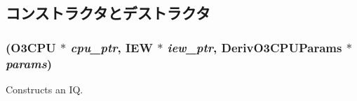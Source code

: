 \subsection{コンストラクタとデストラクタ}
\hypertarget{classInstructionQueue_a70773a251ef988cdd7b3fa494aed7a72}{
\subsubsection[{InstructionQueue}]{ ({\bf O3CPU} $\ast$ {\em cpu\_\-ptr}, \/  {\bf IEW} $\ast$ {\em iew\_\-ptr}, \/  DerivO3CPUParams $\ast$ {\em params})}}
\label{classInstructionQueue_a70773a251ef988cdd7b3fa494aed7a72}
Constructs an IQ. 


